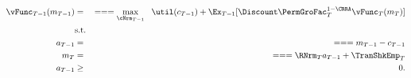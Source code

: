 \begin{equation*}\begin{gathered}\begin{aligned}
{\vFunc}_{T-1}({m}_{T-1})    & = &  =  =  = \max_{\cNrm_{T-1}} ~~ \util({c}_{T-1}) + \Ex_{T-1} [\Discount \PermGroFac_{T}^{1-\CRRA}{\vFunc}_{T}({m}_{T})] \label{eq:ConstrArt}
\\ & \mbox{s.t.}&  \nonumber
\\ {a}_{T-1}    & = &  =  =  = {m}_{T-1} - {c}_{T-1}
\\ {m}_{T}    & = &  =  =  = \RNrm_{T} {a}_{T-1} + \TranShkEmp_{T}
\\ {a}_{T-1} & \geq & 0 .
\end{aligned}\end{gathered}\end{equation*}

